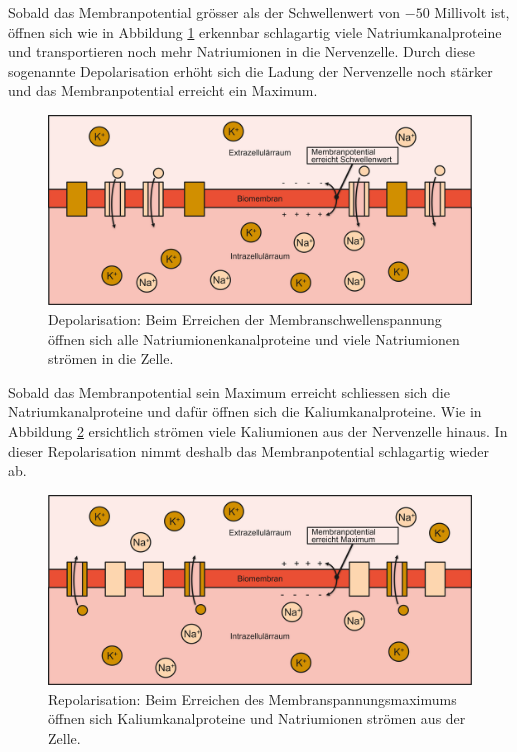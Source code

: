 \begin{refsection}
Sobald das Membranpotential grösser als der Schwellenwert von $-50$ Millivolt ist, öffnen sich wie in Abbildung
\ref{fig:Depolarisation} erkennbar schlagartig viele
Natriumkanalproteine und transportieren noch mehr Natriumionen in die Nervenzelle.
Durch diese sogenannte Depolarisation erhöht sich die Ladung der Nervenzelle noch stärker und das Membranpotential erreicht ein Maximum. 
\begin{figure}[h]
    \centering
    \includegraphics[width=\textwidth]{papers/nerven/Bilder/Vorgang3.png}
    \caption{Depolarisation: Beim Erreichen der Membranschwellenspannung öffnen sich alle Natriumionenkanalproteine und viele Natriumionen strömen in die Zelle.}
    \label{fig:Depolarisation}
\end{figure}

Sobald das Membranpotential sein Maximum erreicht schliessen sich die Natriumkanalproteine und dafür öffnen sich die
Kaliumkanalproteine.
Wie in Abbildung \ref{fig:Repolarisation} ersichtlich strömen viele Kaliumionen aus der Nervenzelle hinaus.
In dieser Repolarisation nimmt deshalb das Membranpotential schlagartig wieder ab.
\begin{figure}[h]
    \centering
    \includegraphics[width=\textwidth]{papers/nerven/Bilder/Vorgang4.png}
    \caption{Repolarisation: Beim Erreichen des Membranspannungsmaximums öffnen sich Kaliumkanalproteine und Natriumionen strömen aus der Zelle.}
    \label{fig:Repolarisation}
\end{figure}


\end{refsection}
